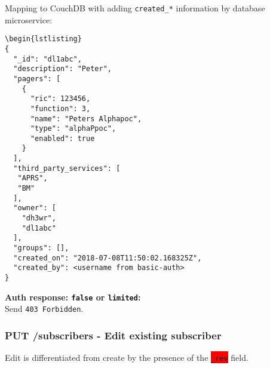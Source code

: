 Mapping to CouchDB with adding \verb|created_*| information by database microservice:\\
\begin{lstlisting}
\begin{lstlisting}
{
  "_id": "dl1abc",
  "description": "Peter",
  "pagers": [
    {
      "ric": 123456,
      "function": 3,
      "name": "Peters Alphapoc",
      "type": "alphaPpoc",
      "enabled": true
    }
  ],
  "third_party_services": [
   "APRS",
   "BM"
  ],
  "owner": [
    "dh3wr",
    "dl1abc"
  ],
  "groups": [],
  "created_on": "2018-07-08T11:50:02.168325Z",
  "created_by": <username from basic-auth>
}
\end{lstlisting}

\textbf{Auth response: \texttt{false} or \texttt{limited}:}\\
Send \verb|403 Forbidden|.

\subsubsection{PUT /subscribers - Edit existing subscriber}
Edit is differentiated from create by the presence of the \colorbox{red}{\texttt{\_rev}} field.

